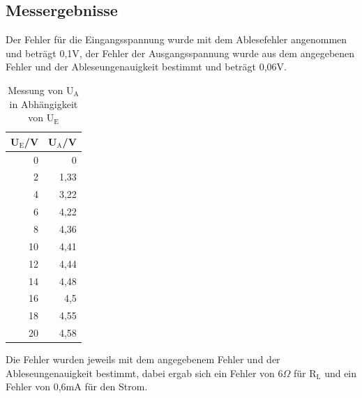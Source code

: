 \documentclass[12pt,a4paper]{article}
\begin{document}
\subsection{Messergebnisse}

Der Fehler für die Eingangsspannung wurde mit dem Ablesefehler angenommen und beträgt 0,1V, der Fehler der Ausgangsspannung wurde aus dem angegebenen Fehler und der Ableseungenauigkeit bestimmt und beträgt 0,06V.

\begin{table}[H]
\caption{Messung von U$_\text{A}$ in Abhängigkeit von U$_\text{E}$}
\begin{center}
\begin{tabular}{|r|r|}
\hline
U$_\text{E}$/V & U$_\text{A}$/V \\ \hline
0 & 0 \\ \hline
2 & 1,33 \\ \hline
4 & 3,22 \\ \hline
6 & 4,22 \\ \hline
8 & 4,36 \\ \hline
10 & 4,41 \\ \hline
12 & 4,44 \\ \hline
14 & 4,48 \\ \hline
16 & 4,5 \\ \hline
18 & 4,55 \\ \hline
20 & 4,58 \\ \hline
\end{tabular}
\end{center}
\label{tab:a_5_u}
\end{table}

Die Fehler wurden jeweils mit dem angegebenem Fehler und der Ableseungenauigkeit bestimmt, dabei ergab sich ein Fehler von 6$\Omega$ für R$_\text{L}$ und ein Fehler von 0,6mA für den Strom.
\end{document}

